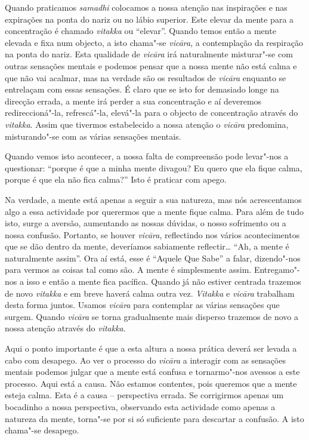 Quando praticamos \emph{samadhi} colocamos a nossa atenção nas
inspirações e nas expirações na ponta do nariz ou no lábio superior.
Este elevar da mente para a concentração é chamado \emph{vitakka} ou
``elevar''. Quando temos então a mente elevada e fixa num objecto, a
isto chama"-se \emph{vicāra}, a contemplação da respiração na ponta do
nariz. Esta qualidade de \emph{vicāra} irá naturalmente misturar"-se com
outras sensações mentais e podemos pensar que a nossa mente não está
calma e que não vai acalmar, mas na verdade são os resultados de
\emph{vicāra} enquanto se entrelaçam com essas sensações. É claro que se
isto for demasiado longe na direcção errada, a mente irá perder a sua
concentração e aí deveremos redireccioná"-la, refrescá"-la, elevá"-la para
o objecto de concentração através do \emph{vitakka}. Assim que tivermos
estabelecido a nossa atenção o \emph{vicāra} predomina, misturando"-se
com as várias sensações mentais.

Quando vemos isto acontecer, a nossa falta de compreensão pode levar"-nos
a questionar: ``porque é que a minha mente divagou? Eu quero que ela
fique calma, porque é que ela não fica calma?'' Isto é praticar com
apego.

Na verdade, a mente está apenas a seguir a sua natureza, mas nós
acrescentamos algo a essa actividade por querermos que a mente fique
calma. Para além de tudo isto, surge a aversão, aumentando as nossas
dúvidas, o nosso sofrimento ou a nossa confusão. Portanto, se houver
\emph{vicāra}, reflectindo nos vários acontecimentos que se dão dentro
da mente, deveríamos sabiamente reflectir\ldots{} ``Ah, a mente é
naturalmente assim''. Ora aí está, esse é ``Aquele Que Sabe'' a falar,
dizendo"-nos para vermos as coisas tal como são. A mente é simplesmente
assim. Entregamo"-nos a isso e então a mente fica pacífica. Quando já não
estiver centrada trazemos de novo \emph{vitakka} e em breve haverá calma
outra vez. \emph{Vitakka} e \emph{vicāra} trabalham desta forma juntos.
Usamos \emph{vicāra} para contemplar as várias sensações que surgem.
Quando \emph{vicāra} se torna gradualmente mais disperso trazemos de
novo a nossa atenção através do \emph{vitakka}.

Aqui o ponto importante é que a esta altura a nossa prática deverá ser
levada a cabo com desapego. Ao ver o processo do \emph{vicāra} a
interagir com as sensações mentais podemos julgar que a mente está
confusa e tornarmo"-nos avessos a este processo. Aqui está a causa. Não
estamos contentes, pois queremos que a mente esteja calma. Esta é a
causa -- perspectiva errada. Se corrigirmos apenas um bocadinho a nossa
perspectiva, observando esta actividade como apenas a natureza da mente,
torna"-se por si só suficiente para descartar a confusão. A isto chama"-se
desapego.

